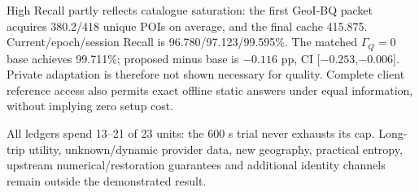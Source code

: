 High Recall partly reflects catalogue saturation: the first GeoI-BQ packet
acquires 380.2/418 unique POIs on average, and the final cache 415.875.
Current/epoch/session Recall is 96.780/97.123/99.595\%.
The matched $\Gamma_Q=0$ base achieves 99.711\%; proposed minus base is
$-0.116$ pp, CI [$-0.253$,$-0.006$]. Private adaptation is therefore not
shown necessary for quality. Complete client reference access also permits exact
offline static answers under equal information, without implying zero setup cost.

All ledgers spend 13--21 of 23 units: the 600 s trial never exhausts its cap.
Long-trip utility, unknown/dynamic provider data, new geography, practical entropy,
upstream numerical/restoration guarantees and additional identity channels remain
outside the demonstrated result.
